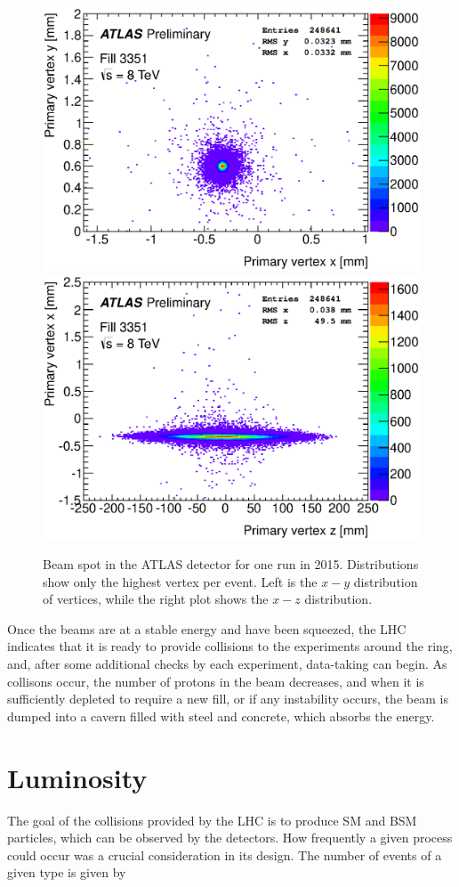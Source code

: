 \begin{centering}
\begin{figure}[!hbt]
\myfloatalign
\includegraphics[width=.45\linewidth]{figures/lhc/beamspot-run215456-vtx-yx.eps}
\includegraphics[width=.45\linewidth]{figures/lhc/beamspot-run215456-vtx-xz.eps}
\caption{Beam spot in the \ac{ATLAS} detector for one run in 2015. Distributions show only the highest \pt vertex per event. Left is the $x-y$ distribution of vertices, while the right plot shows the $x-z$ distribution.}
\label{fig:beam_spot}
\end{figure}
\end{centering}

Once the beams are at a stable energy and have been squeezed, the \ac{LHC} indicates that it is ready to provide collisions to the experiments around the ring, and, after some additional checks by each experiment, data-taking can begin. As collisons occur, the number of protons in the beam decreases, and when it is sufficiently depleted to require a new fill, or if any instability occurs, the beam is dumped into a cavern filled with steel and concrete, which absorbs the energy. 

\section{Luminosity}

The goal of the collisions provided by the \ac{LHC} is to produce \ac{SM} and \ac{BSM} particles, which can be observed by the detectors. How frequently a given process could occur was a crucial consideration in its design. The number of events of a given type is given by

